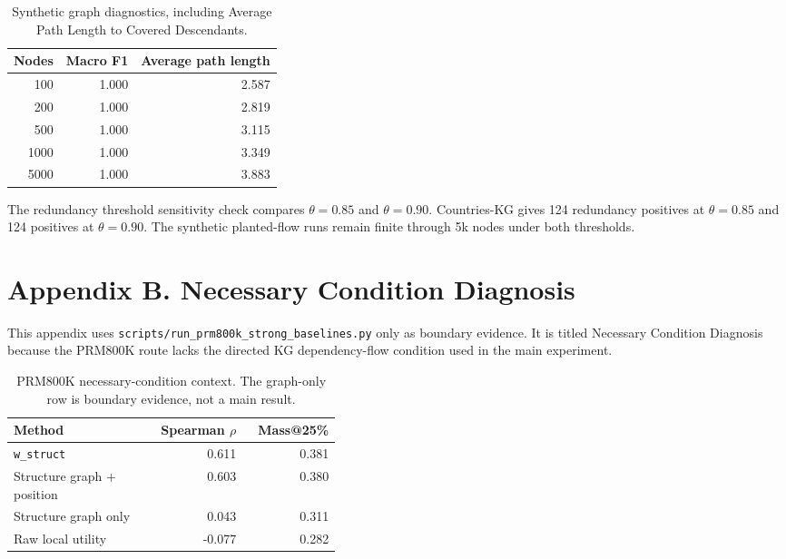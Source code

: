 \documentclass[pdflatex,sn-mathphys-num]{sn-jnl}
\begin{document}
\begin{table}[h]
\caption{Synthetic graph diagnostics, including Average Path Length to Covered Descendants.}
\label{tab:supp-synthetic-path-length}
\centering
\small
\begin{tabular}{rrr}
\toprule
\textbf{Nodes} & \textbf{Macro F1} & \textbf{Average path length} \\
\midrule
100 & 1.000 & 2.587 \\
200 & 1.000 & 2.819 \\
500 & 1.000 & 3.115 \\
1000 & 1.000 & 3.349 \\
5000 & 1.000 & 3.883 \\
\bottomrule
\end{tabular}
\end{table}

The redundancy threshold sensitivity check compares $\theta=0.85$ and $\theta=0.90$. Countries-KG gives 124 redundancy positives at $\theta=0.85$ and 124 positives at $\theta=0.90$. The synthetic planted-flow runs remain finite through 5k nodes under both thresholds.

\section{Appendix B. Necessary Condition Diagnosis}
\label{app:supp-necessary-condition}

This appendix uses \texttt{scripts/run\_prm800k\_strong\_baselines.py} only as boundary evidence. It is titled Necessary Condition Diagnosis because the PRM800K route lacks the directed KG dependency-flow condition used in the main experiment.

\begin{table}[h]
\caption{PRM800K necessary-condition context. The graph-only row is boundary evidence, not a main result.}
\label{tab:supp-necessary-condition-context}
\centering
\small
\begin{tabular}{Z{0.42\linewidth}rr}
\toprule
\textbf{Method} & \textbf{Spearman $\rho$} & \textbf{Mass@25\%} \\
\midrule
\texttt{w\_struct} & 0.611 & 0.381 \\
Structure graph + position & 0.603 & 0.380 \\
Structure graph only & 0.043 & 0.311 \\
Raw local utility & -0.077 & 0.282 \\
\bottomrule
\end{tabular}
\end{table}
\end{document}
